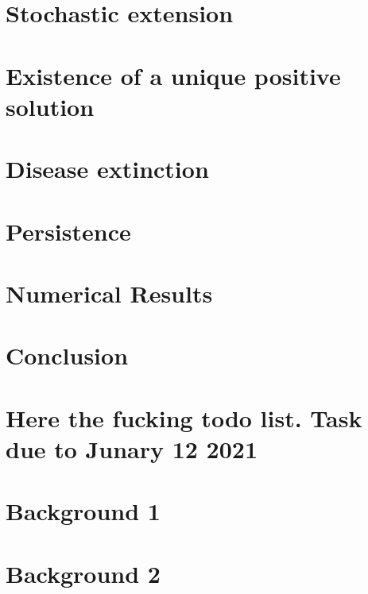 \documentclass[smallextended]{svjour3}
\begin{document}
	\section{Stochastic extension}
		
	\section{Existence of a unique positive solution}
		\label{sec:solution_existence}
		
	\section{Disease extinction}
		\label{extinction}
		
	\section{Persistence}
		\label{sec:persistence}
		
		
	\section{Numerical Results}
		\label{sec:numerics}
		
	\section{Conclusion}
		\label{sec:conclusion}
	    
	\section{Here the fucking todo list. Task due to Junary 12 2021}
	\listoftodos
	\appendix
	\section{Background 1}
	
	\label{app::A}
	\section{Background 2}
	
	\label{app::B}
	{}
    
\end{document}

